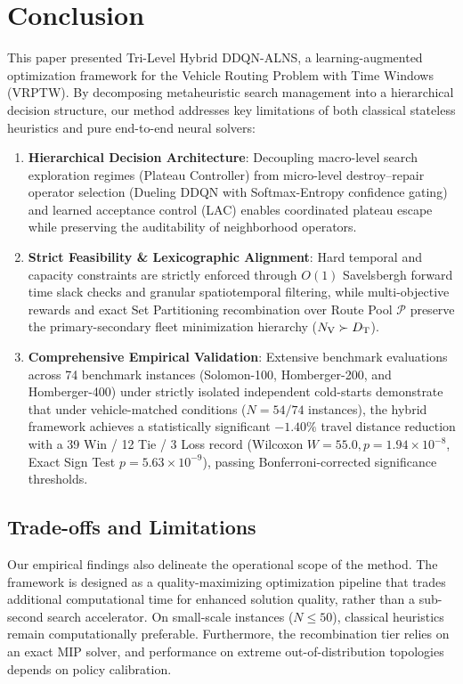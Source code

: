 \section{Conclusion}
\label{sec:conclusion}

This paper presented Tri-Level Hybrid DDQN-ALNS, a learning-augmented optimization framework for the Vehicle Routing Problem with Time Windows (VRPTW). By decomposing metaheuristic search management into a hierarchical decision structure, our method addresses key limitations of both classical stateless heuristics and pure end-to-end neural solvers:
\begin{enumerate}
    \item \textbf{Hierarchical Decision Architecture}: Decoupling macro-level search exploration regimes (Plateau Controller) from micro-level destroy--repair operator selection (Dueling DDQN with Softmax-Entropy confidence gating) and learned acceptance control (LAC) enables coordinated plateau escape while preserving the auditability of neighborhood operators.
    \item \textbf{Strict Feasibility \& Lexicographic Alignment}: Hard temporal and capacity constraints are strictly enforced through $O(1)$ Savelsbergh forward time slack checks and granular spatiotemporal filtering, while multi-objective rewards and exact Set Partitioning recombination over Route Pool $\mathcal{P}$ preserve the primary-secondary fleet minimization hierarchy (${N_\mathrm{V}} \succ {D_\mathrm{T}}$).
    \item \textbf{Comprehensive Empirical Validation}: Extensive benchmark evaluations across 74 benchmark instances (Solomon-100, Homberger-200, and Homberger-400) under strictly isolated independent cold-starts demonstrate that under vehicle-matched conditions ($N=54/74$ instances), the hybrid framework achieves a statistically significant $-1.40\%$ travel distance reduction with a 39 Win / 12 Tie / 3 Loss record (Wilcoxon $W=55.0, p=1.94 \times 10^{-8}$, Exact Sign Test $p=5.63 \times 10^{-9}$), passing Bonferroni-corrected significance thresholds.
\end{enumerate}

\subsection{Trade-offs and Limitations}
\label{sec:concl_tradeoffs}
Our empirical findings also delineate the operational scope of the method. The framework is designed as a quality-maximizing optimization pipeline that trades additional computational time for enhanced solution quality, rather than a sub-second search accelerator. On small-scale instances ($N \le 50$), classical heuristics remain computationally preferable. Furthermore, the recombination tier relies on an exact MIP solver, and performance on extreme out-of-distribution topologies depends on policy calibration.

